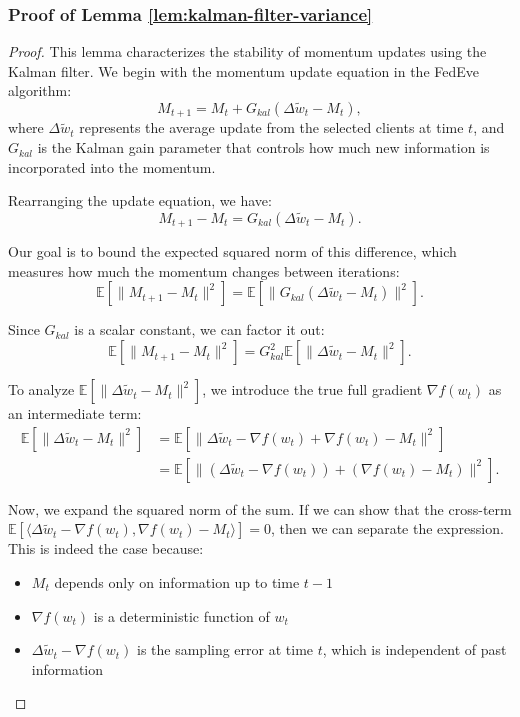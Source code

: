 \subsubsection{Proof of Lemma \ref{lem:kalman-filter-variance}}
\begin{proof}
    This lemma characterizes the stability of momentum updates using the Kalman filter. We begin with the momentum update equation in the FedEve algorithm:
    \[
        M_{t+1} = M_t + G_{kal}(\Delta \tilde{w}_t - M_t),
    \]
    where \(\Delta \tilde{w}_t\) represents the average update from the selected clients at time \(t\), and \(G_{kal}\) is the Kalman gain parameter that controls how much new information is incorporated into the momentum.
    
    Rearranging the update equation, we have:
    \[
        M_{t+1} - M_t = G_{kal}(\Delta \tilde{w}_t - M_t).
    \]
    
    Our goal is to bound the expected squared norm of this difference, which measures how much the momentum changes between iterations:
    \[
        \mathbb{E}[\|M_{t+1} - M_t\|^2] = \mathbb{E}[\|G_{kal}(\Delta \tilde{w}_t - M_t)\|^2].
    \]
    
    Since \(G_{kal}\) is a scalar constant, we can factor it out:
    \[
        \mathbb{E}[\|M_{t+1} - M_t\|^2] = G_{kal}^2 \mathbb{E}[\|\Delta \tilde{w}_t - M_t\|^2].
    \]
    
    To analyze \(\mathbb{E}[\|\Delta \tilde{w}_t - M_t\|^2]\), we introduce the true full gradient \(\nabla f(w_t)\) as an intermediate term:
    \begin{align*}
        \mathbb{E}[\|\Delta \tilde{w}_t - M_t\|^2] &= \mathbb{E}[\|\Delta \tilde{w}_t - \nabla f(w_t) + \nabla f(w_t) - M_t\|^2] \\
        &= \mathbb{E}[\|(\Delta \tilde{w}_t - \nabla f(w_t)) + (\nabla f(w_t) - M_t)\|^2].
    \end{align*}
    
    Now, we expand the squared norm of the sum. If we can show that the cross-term \(\mathbb{E}[\langle \Delta \tilde{w}_t - \nabla f(w_t), \nabla f(w_t) - M_t \rangle] = 0\), then we can separate the expression. This is indeed the case because:
    \begin{itemize}
        \item \(M_t\) depends only on information up to time \(t-1\)
        \item \(\nabla f(w_t)\) is a deterministic function of \(w_t\)
        \item \(\Delta \tilde{w}_t - \nabla f(w_t)\) is the sampling error at time \(t\), which is independent of past information
    \end{itemize}
    

\end{proof}
